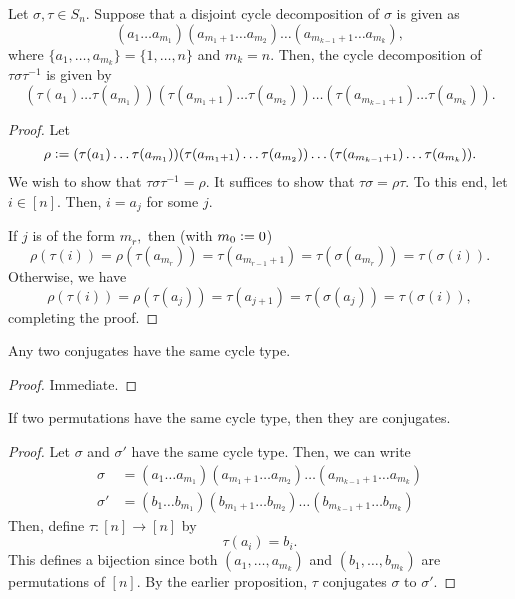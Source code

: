 \begin{prop}
	Let $\sigma, \tau \in S_n.$ Suppose that a disjoint cycle decomposition of $\sigma$ is given as
	\begin{equation*} 
		(a_1 \ldots a_{m_1})(a_{m_1 + 1} \ldots a_{m_2})\ldots(a_{m_{k-1} + 1} \ldots a_{m_k}),
	\end{equation*}
	where $\{a_1, \ldots, a_{m_k}\} = \{1, \ldots, n\}$ and $m_k = n.$ Then, the cycle decomposition of $\tau\sigma\tau^{-1}$ is given by
	\begin{equation*} 
		(\tau(a_1) \ldots \tau(a_{m_1}))(\tau(a_{m_1 + 1}) \ldots \tau(a_{m_2}))\ldots(\tau(a_{m_{k-1} + 1}) \ldots \tau(a_{m_k})).
	\end{equation*}
\end{prop}
\begin{proof} 
	Let 
	\begin{equation*} 
		\rho \vcentcolon= (\tau(a_1) \ldots \tau(a_{m_1}))(\tau(a_{m_1 + 1}) \ldots \tau(a_{m_2}))\ldots(\tau(a_{m_{k-1} + 1}) \ldots \tau(a_{m_k})).
	\end{equation*}
	We wish to show that $\tau\sigma\tau^{-1} = \rho.$ It suffices to show that $\tau\sigma = \rho\tau.$ To this end, let $i \in [n].$ Then, $i = a_{j}$ for some $j.$ 

	If $j$ is of the form $m_r,$ then (with $m_0 \vcentcolon= 0$)
	\begin{equation*} 
		\rho(\tau(i)) = \rho(\tau(a_{m_r})) = \tau(a_{m_{r-1} + 1}) = \tau(\sigma(a_{m_r})) = \tau(\sigma(i)).
	\end{equation*}
	Otherwise, we have
	\begin{equation*} 
		\rho(\tau(i)) = \rho(\tau(a_j)) = \tau(a_{j+1}) = \tau(\sigma(a_j)) = \tau(\sigma(i)),
	\end{equation*}
	completing the proof.
\end{proof}

\begin{cor}
	Any two conjugates have the same cycle type.
\end{cor}
\begin{proof} 
	Immediate.
\end{proof}

\begin{cor}
	If two permutations have the same cycle type, then they are conjugates.
\end{cor}
\begin{proof} 
	Let $\sigma$ and $\sigma'$ have the same cycle type. Then, we can write
	\begin{align*} 
		\sigma &= (a_1 \ldots a_{m_1})(a_{m_1 + 1} \ldots a_{m_2})\ldots(a_{m_{k-1} + 1} \ldots a_{m_k})\\
		\sigma' &= (b_1 \ldots b_{m_1})(b_{m_1 + 1} \ldots b_{m_2})\ldots(b_{m_{k-1} + 1} \ldots b_{m_k})
	\end{align*}
	Then, define $\tau:[n] \to [n]$ by
	\begin{equation*} 
		\tau(a_i) = b_i.
	\end{equation*}
	This defines a bijection since both $(a_1, \ldots, a_{m_k})$ and $(b_1, \ldots, b_{m_k})$ are permutations of $[n].$ By the earlier proposition, $\tau$ conjugates $\sigma$ to $\sigma'.$
\end{proof}

